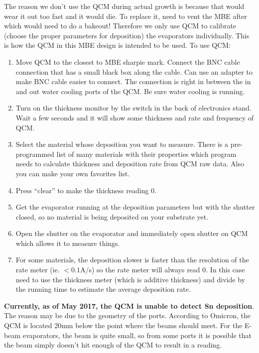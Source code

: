 The reason we don’t use the QCM during actual growth is because that would wear it out too fast and it would die. To replace it, need to vent the MBE after which would need to do a bakeout! Therefore we only use QCM to calibrate (choose the proper parameters for deposition) the evaporators individually. This is how the QCM in this MBE design is intended to be used.
To use QCM:
\begin{enumerate}
\item	Move QCM to the closest to MBE sharpie mark. Connect the BNC cable connection that has a small black box along the cable. Can use an adapter to make BNC cable easier to connect. The connection is right in between the in and out water cooling ports of the QCM. Be sure water cooling is running.
\item	Turn on the thickness monitor by the switch in the back of electronics stand. Wait a few seconds and it will show some thickness and rate and frequency of QCM. 
\item	Select the material whose deposition you want to measure. There is a pre-programmed list of many materials with their properties which program needs to calculate thickness and deposition rate from QCM raw data. Also you can make your own favorites list.
\item	Press “clear” to make the thickness reading 0.
\item	Get the evaporator running at the deposition parameters but with the shutter closed, so no material is being deposited on your substrate yet. 
\item	Open the shutter on the evaporator and immediately open shutter on QCM which allows it to measure things.
\item	For some materials, the deposition slower is faster than the resolution of the rate meter (ie. $<0.1$A/s) so the rate meter will always read 0. In this case need to use the thickness meter (which is additive thickness) and divide by the running time to estimate the average deposition rate.
\end{enumerate}

\textbf{Currently, as of May 2017, the QCM is unable to detect Sn deposition}. The reason may be due to the geometry of the ports. According to Omicron, the QCM is located 20mm below the point where the beams should meet. For the E-beam evaporators, the beam is quite small, so from some ports it is possible that the beam simply doesn't hit enough of the QCM to result in a reading.
